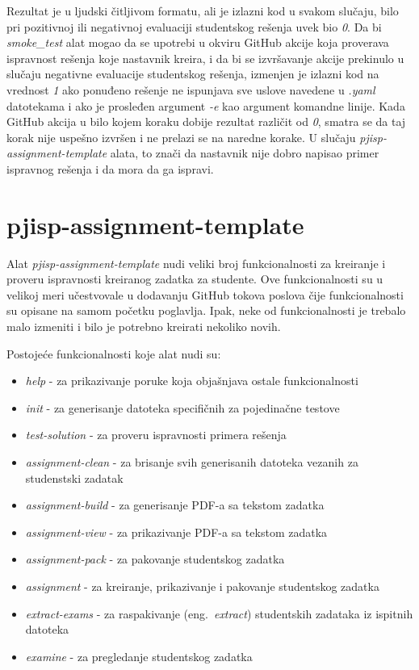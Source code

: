 \documentclass[12pt]{report}
\begin{document}
Rezultat je u ljudski čitljivom formatu, ali je izlazni kod u svakom slučaju, bilo pri pozitivnoj ili negativnoj evaluaciji studentskog rešenja uvek bio \textit{0}. Da bi \textit{smoke\_test} alat mogao da se upotrebi u okviru GitHub akcije koja proverava ispravnost rešenja koje nastavnik kreira, i da bi se izvršavanje akcije prekinulo u slučaju negativne evaluacije studentskog rešenja, izmenjen je izlazni kod na vrednost \textit{1} ako ponuđeno rešenje ne ispunjava sve uslove navedene u \textit{.yaml} datotekama i ako je prosleđen argument \textit{-e} kao argument komandne linije. Kada GitHub akcija u bilo kojem koraku dobije rezultat različit od \textit{0}, smatra se da taj korak nije uspešno izvršen i ne prelazi se na naredne korake. U slučaju \textit{pjisp-assignment-template} alata, to znači da nastavnik nije dobro napisao primer ispravnog rešenja i da mora da ga ispravi.

\section{pjisp-assignment-template}
Alat \textit{pjisp-assignment-template} nudi veliki broj funkcionalnosti za kreiranje i proveru ispravnosti kreiranog zadatka za studente. Ove funkcionalnosti su u velikoj meri učestvovale u dodavanju GitHub tokova poslova čije funkcionalnosti su opisane na samom početku poglavlja. Ipak, neke od funkcionalnosti je trebalo malo izmeniti i bilo je potrebno kreirati nekoliko novih.

Postojeće funkcionalnosti koje alat nudi su:

\begin{itemize}
    \item \textit{help} - za prikazivanje poruke koja objašnjava ostale funkcionalnosti
    \item \textit{init} - za generisanje datoteka specifičnih za pojedinačne testove
    \item \textit{test-solution} - za proveru ispravnosti primera rešenja
    \item \textit{assignment-clean} - za brisanje svih generisanih datoteka vezanih za studenstski zadatak
    \item \textit{assignment-build} - za generisanje PDF-a sa tekstom zadatka
    \item \textit{assignment-view} - za prikazivanje PDF-a sa tekstom zadatka
    \item \textit{assignment-pack} - za pakovanje studentskog zadatka
    \item \textit{assignment} - za kreiranje, prikazivanje i pakovanje studentskog zadatka
    \item \textit{extract-exams} - za raspakivanje (eng.\ \textit{extract}) studentskih zadataka iz ispitnih datoteka
    \item \textit{examine} - za pregledanje studentskog zadatka
\end{itemize}
\end{document}
